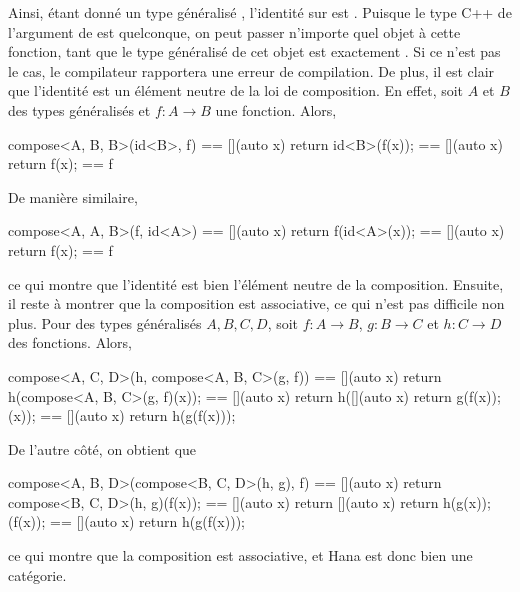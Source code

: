Ainsi, étant donné un type généralisé , l'identité sur  est
. Puisque le type C++ de l'argument de  est quelconque,
on peut passer n'importe quel objet à cette fonction, tant que le type
généralisé de cet objet est exactement . Si ce n'est pas le cas,
le compilateur rapportera une erreur de compilation. De plus, il est clair
que l'identité est un élément neutre de la loi de composition. En effet, soit
$A$ et $B$ des types généralisés et $f : A \to B$ une fonction. Alors,
\begin{cpp}
    compose<A, B, B>(id<B>, f) == [](auto x) { return id<B>(f(x)); }
                               == [](auto x) { return f(x); }
                               == f
\end{cpp}

De manière similaire,
\begin{cpp}
    compose<A, A, B>(f, id<A>) == [](auto x) { return f(id<A>(x)); }
                               == [](auto x) { return f(x); }
                               == f
\end{cpp}

ce qui montre que l'identité est bien l'élément neutre de la composition.
Ensuite, il reste à montrer que la composition est associative, ce qui n'est
pas difficile non plus. Pour des types généralisés $A, B, C, D$, soit
$f : A \to B$, $g : B \to C$ et $h : C \to D$ des fonctions. Alors,
\begin{cpp}
    compose<A, C, D>(h, compose<A, B, C>(g, f))
        == [](auto x) { return h(compose<A, B, C>(g, f)(x)); }
        == [](auto x) { return h([](auto x) { return g(f(x)); }(x)); }
        == [](auto x) { return h(g(f(x))); }
\end{cpp}

De l'autre côté, on obtient que
\begin{cpp}
    compose<A, B, D>(compose<B, C, D>(h, g), f)
        == [](auto x) { return compose<B, C, D>(h, g)(f(x)); }
        == [](auto x) { return [](auto x) { return h(g(x)); }(f(x)); }
        == [](auto x) { return h(g(f(x))); }
\end{cpp}

ce qui montre que la composition est associative, et Hana est donc bien une
catégorie.

